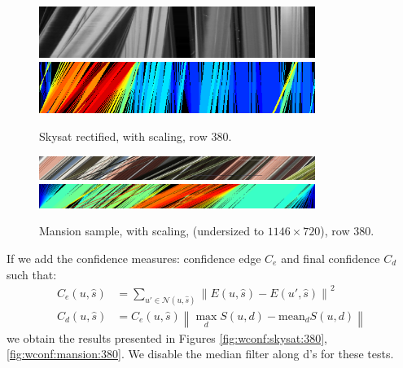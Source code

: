 \documentclass{article}
\newcommand{\norm}[1]{\left\lVert#1\right\rVert}
\def\epiWidth{0.8}
\theoremstyle{definition}
\begin{document}
\begin{figure}[ht]
  \centering
  \includegraphics[width=\epiWidth\textwidth]{images/1520334265034_epi.png}\\
  \includegraphics[width=\epiWidth\textwidth]{images/1520334265034_epi_colored.png}
  \caption{Skysat rectified, with scaling, row 380.}
  \label{fig:wscaling:skysat:380}
\end{figure}


\begin{figure}[ht]
  \centering
  \includegraphics[width=\epiWidth\textwidth]{images/1520334290628_epi.png}\\
  \includegraphics[width=\epiWidth\textwidth]{images/1520334290628_epi_colored.png}
  \caption{Mansion sample, with scaling, (undersized to $1146\times 720$), row 380.}
  \label{fig:wscaling:mansion:380}
\end{figure}


If we add the confidence measures: confidence edge $C_e$ and final confidence $C_d$ such that:
\begin{align}
 C_e (u, \widehat{s}) &= \sum_{u' \in \mathcal{N}(u, \widehat{s})} \norm{E(u, \widehat{s}) - E(u', \widehat{s})}^2 \\
 C_d (u, \widehat{s}) &= C_e (u, \widehat{s}) \norm{\max_d S(u, d) - \mathrm{mean}_d S(u, d)}
\end{align}
we obtain the results presented in Figures \ref{fig:wconf:skysat:380}, \ref{fig:wconf:mansion:380}. We disable the median filter along d's for these tests.
\end{document}
